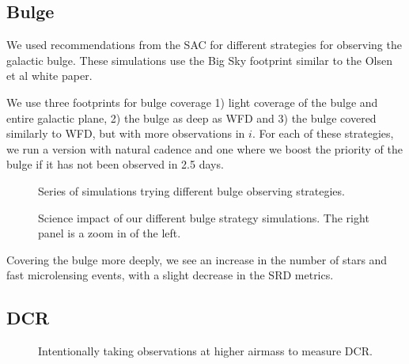 \subsection{Bulge}

We used recommendations from the SAC for different strategies for observing the galactic bulge. These simulations use the Big Sky footprint similar to the Olsen et al white paper.  

We use three footprints for bulge coverage 1) light coverage of the bulge and entire galactic plane, 2) the bulge as deep as WFD and 3) the bulge covered similarly to WFD, but with more observations in $i$.  For each of these strategies, we run a version with natural cadence and one where we boost the priority of the bulge if it has not been observed in 2.5 days. 

\begin{figure}
\caption{Series of simulations trying different bulge observing strategies.}\label{fig:bulge}
\end{figure}

\begin{figure}
\caption{Science impact of our different bulge strategy simulations. The right panel is a zoom in of the left.}\label{fig:bulgeradar}
\end{figure}

Covering the bulge more deeply, we see an increase in the number of stars and fast microlensing events, with a slight decrease in the SRD metrics.

\subsection{DCR}

\begin{figure}
\caption{Intentionally taking observations at higher airmass to measure DCR.}
\end{figure}


